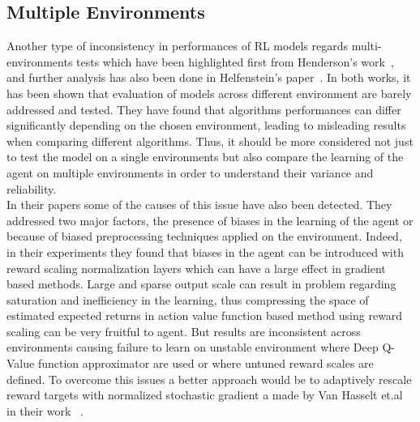 \documentclass{article}
\begin{document}
\subsection{Multiple Environments}
Another type of inconsistency in performances of RL models regards multi-environments tests which have been highlighted first from Henderson's work~\cite{DRL01}, and further analysis has also been done in Helfenstein's paper~\cite{BenchmarkingDRL}.  In both works, it has been shown that evaluation of models across different environment are barely addressed and tested. 
They have found that algorithms performances can differ significantly depending on the chosen environment, leading to misleading results when comparing different algorithms. Thus, it should be more considered not just to test the model on a single environments but also compare the learning of the agent on multiple environments in order to understand their variance and reliability.\\
In their papers some of the causes of this issue have also been detected. They addressed two major factors, the presence of biases in the learning of the agent or because of biased preprocessing techniques applied on the environment. Indeed, in their experiments they found that biases in the agent can be introduced with reward scaling normalization layers which can have a large effect in gradient based methods. Large and sparse output scale can result in problem regarding saturation and inefficiency in the learning, thus compressing the space of estimated expected returns in action value function based method using reward scaling can be very fruitful to agent. But results are inconsistent across environments causing failure to learn on unstable environment where Deep Q-Value function approximator are used or where untuned reward scales are defined. To overcome this issues a better approach would be to adaptively rescale reward targets with normalized stochastic gradient a made by Van Hasselt et.al in their work ~\cite{VaHasselt}.
\end{document}
